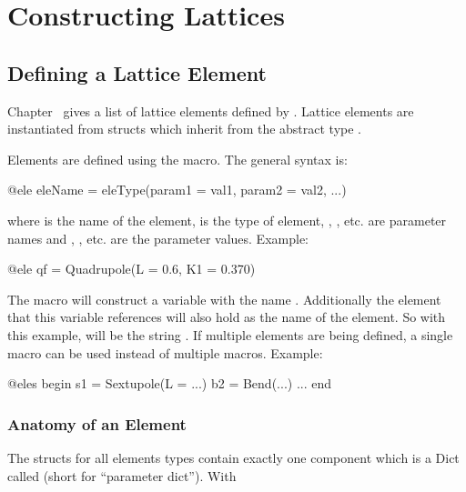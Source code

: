\chapter{Constructing Lattices}
\label{c:construct-lat}


\section{Defining a Lattice Element}
\label{s:ele.def}


Chapter~ gives a list of lattice elements defined by \accellat. 
Lattice elements are instantiated from structs which inherit from the abstract type .

Elements are defined using the  macro. The general syntax is:
\begin{example}
  @ele eleName = eleType(param1 = val1, param2 = val2, ...)
\end{example}
where  is the name of the element,  is the type of element, , ,
etc. are parameter names and , , etc. are the parameter values.
Example:
\begin{example}
  @ele qf = Quadrupole(L = 0.6, K1 = 0.370)
\end{example}
The  macro will construct a \julia variable with the name . Additionally the element
that this variable references will also hold  as the name of the element. So with this
example,  will be the string . If multiple elements are being defined, a single
 macro can be used instead of multiple  macros. Example:
\begin{example}
  @eles begin
    s1 = Sextupole(L = ...)
    b2 = Bend(...)
    ...
  end
\end{example}

\subsection{Anatomy of an Element}
\label{s:ele.type}

The structs for all elements types contain exactly one component which is a Dict called 
(short for ``parameter dict''). With 






